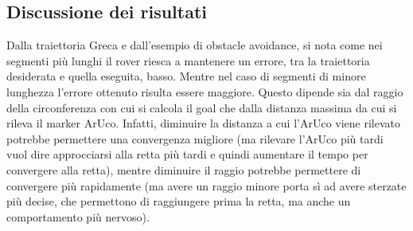 \subsection{Discussione dei risultati}
Dalla traiettoria Greca e dall'esempio di obstacle avoidance, si nota come nei segmenti più lunghi il rover riesca a mantenere un errore, tra la traiettoria desiderata e quella eseguita, basso. Mentre nel caso di segmenti di minore lunghezza l'errore ottenuto risulta essere maggiore. Questo dipende sia dal raggio della circonferenza con cui si calcola il goal che dalla distanza massima da cui si rileva il marker ArUco. Infatti, diminuire la distanza a cui l'ArUco viene rilevato potrebbe permettere una convergenza migliore (ma rilevare l'ArUco più tardi vuol dire approcciarsi alla retta più tardi e quindi aumentare il tempo per convergere alla retta), mentre diminuire il raggio potrebbe permettere di convergere più rapidamente (ma avere un raggio minore porta sì ad avere sterzate più decise, che permettono di raggiungere prima la retta, ma anche un comportamento più nervoso).  
